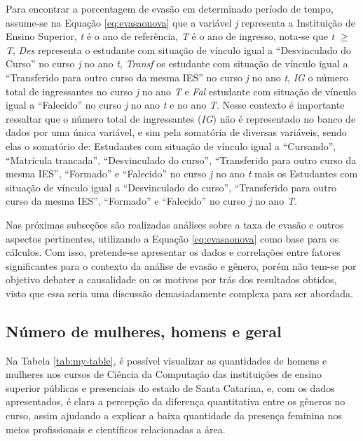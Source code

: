 \documentclass[a4paper]{article}
\begin{document}
Para encontrar a porcentagem de evasão em determinado período de tempo, assume-se na Equação \ref{eq:evasaonova} que a variável \textit{j} representa a Instituição de Ensino Superior, \textit{t} é o ano de referência, \textit{T} é o ano de ingresso, nota-se que \textit{t} $\geq$ \textit{T}, \textit{Des} representa o estudante com situação de vínculo igual a “Desvinculado do Curso” no curso \textit{j} no ano \textit{t}, \textit{Transf} os estudante com situação de vínculo igual a “Transferido para outro curso da mesma IES” no curso \textit{j} no ano \textit{t}, \textit{IG} o número total de ingressantes no curso \textit{j} no ano \textit{T} e \textit{Fal} estudante com situação de vínculo igual a “Falecido” no curso \textit{j} no ano \textit{t} e no ano \textit{T}. Nesse contexto é importante ressaltar que o número total de ingressantes (\textit{IG}) não é representado no banco de dados por uma única variável, e sim pela somatória de diversas variáveis, sendo elas o somatório de: Estudantes com situação de vínculo igual a ``Cursando'', ``Matrícula trancada'', ``Desvinculado do curso'', ``Transferido para outro curso da mesma IES'', ``Formado” e  ``Falecido'' no curso \textit{j} no ano \textit{t} mais os Estudantes com situação de vínculo igual a ``Desvinculado do curso'', ``Transferido para outro curso da mesma IES'', ``Formado'' e  ``Falecido'' no curso \textit{j} no ano \textit{T}.

Nas próximas subseções são realizadas análises sobre a taxa de evasão e outros aspectos pertinentes, utilizando a Equação \ref{eq:evasaonova} como base para os cálculos. Com isso, pretende-se apresentar os dados e correlações entre fatores significantes para o contexto da análise de evasão e gênero, porém não tem-se por objetivo debater a causalidade ou os motivos por trás dos resultados obtidos, visto que essa seria uma discussão demasiadamente complexa para ser abordada.
\subsection{Número de mulheres, homens e geral}\label{sec:mulheresehomensgeral}

Na Tabela \ref{tab:my-table}, é possível visualizar as quantidades de homens e mulheres nos cursos de Ciência da Computação das instituições de ensino superior públicas e presenciais do estado de Santa Catarina, e, com os dados apresentados, é clara a percepção da diferença quantitativa entre os gêneros no curso, assim ajudando a explicar a baixa quantidade da presença feminina nos meios profissionais e científicos relacionadas a área.
\end{document}

